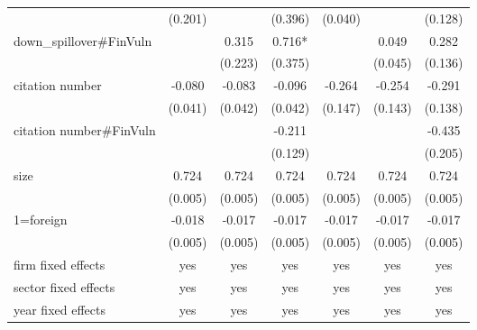 \documentclass[12pt]{article}%
\begin{document}
\begin{CJK*}{GBK}{fs}
\begin{table}[!h]
{{{\begin{tabular}{l*{6}{c}}
           &    (0.201) &            &    (0.396) &    (0.040) &            &    (0.128) \\
down\_spillover\#FinVuln &            &      0.315 &     0.716* &            &      0.049 &    0.282\sym{**} \\

           &            &    (0.223) &    (0.375) &            &    (0.045) &    (0.136) \\

citation number &    -0.080\sym{*} &    -0.083\sym{*} &   -0.096\sym{**} &    -0.264\sym{*} &    -0.254\sym{*} &   -0.291\sym{**} \\

           &    (0.041) &    (0.042) &    (0.042) &    (0.147) &    (0.143) &    (0.138) \\
citation number\#FinVuln &            &            &     -0.211 &            &            &   -0.435\sym{**} \\

           &            &            &    (0.129) &            &            &    (0.205) \\

      size &   0.724\sym{***} &   0.724\sym{***} &   0.724\sym{***} &   0.724\sym{***} &   0.724\sym{***} &   0.724\sym{***} \\

           &    (0.005) &    (0.005) &    (0.005) &    (0.005) &    (0.005) &    (0.005) \\

 1=foreign &  -0.018\sym{***} &  -0.017\sym{***} &  -0.017\sym{***} &  -0.017\sym{***} &  -0.017\sym{***} &  -0.017\sym{***} \\

           &    (0.005) &    (0.005) &    (0.005) &    (0.005) &    (0.005) &    (0.005) \\
\hline
firm fixed effects      &     yes         &       yes&     yes     &      yes&      yes        &     yes\\
sector fixed effects      &     yes         &       yes&     yes     &      yes&      yes        &     yes\\
year fixed effects      &     yes         &       yes&     yes     &      yes&      yes        &     yes\\


\end{tabular}}}}
\end{table}
\end{CJK*}
\end{document}
